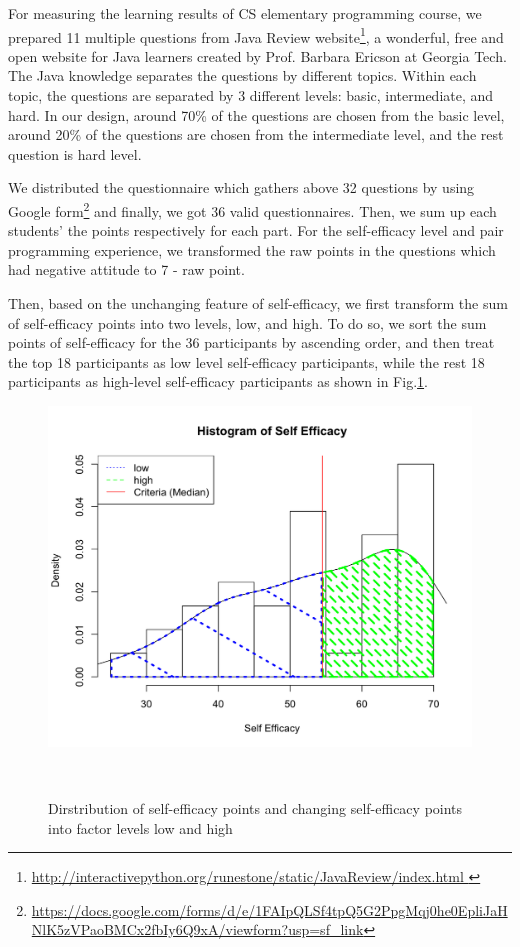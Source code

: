 \documentclass{sigchi}
\begin{document}
For measuring the learning results of CS elementary programming course, we prepared 11 multiple questions from Java Review website\footnote{\url{http://interactivepython.org/runestone/static/JavaReview/index.html }}, a wonderful, free and open website for Java learners created by Prof. Barbara Ericson at Georgia Tech.  The Java knowledge separates the questions by different topics. Within each topic, the questions are separated by 3 different levels: basic, intermediate, and hard. In our design, around 70\% of the questions are chosen from the basic level, around 20\% of the questions are chosen from the intermediate level, and the rest question is hard level. 

We distributed the questionnaire which gathers above 32  questions by using Google form\footnote{\url{https://docs.google.com/forms/d/e/1FAIpQLSf4tpQ5G2PpgMqj0he0EpliJaHNlK5zVPaoBMCx2fbIy6Q9xA/viewform?usp=sf_link}} and finally, we got 36 valid questionnaires. Then, we sum up each students' the points respectively for each part. For the self-efficacy level and pair programming experience,  we transformed the raw points in the questions which had negative attitude to 7 - raw point. 

Then, based on the unchanging feature of self-efficacy, we first transform the sum of self-efficacy points into two levels, low, and high. To do so, we sort the sum points of self-efficacy for the 36 participants by ascending order, and then treat the top 18 participants as low level self-efficacy participants, while the rest 18 participants as high-level self-efficacy participants as shown in Fig.\ref{fig:figure1}.

\begin{figure}
\centering
  \includegraphics[width=0.9\columnwidth]{figures/hist1}
  \caption{Dirstribution of self-efficacy points and changing self-efficacy points into  factor levels low and high }~\label{fig:figure1}
\end{figure}
\end{document}
